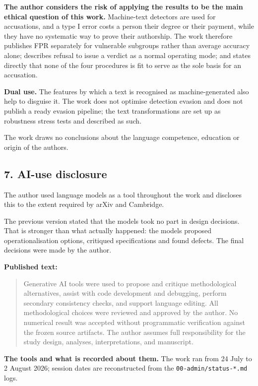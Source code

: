 \documentclass[11pt,a4paper]{article}
\renewcommand{\_}{\textunderscore\allowbreak}
\begin{document}
\textbf{The author considers the risk of applying the results to be the main ethical
question of this work.} Machine-text detectors are used for accusations, and a
type I error costs a person their degree or their payment, while they have no
systematic way to prove their authorship. The work therefore publishes FPR
separately for vulnerable subgroups rather than average accuracy alone; describes
refusal to issue a verdict as a normal operating mode; and states directly that none
of the four procedures is fit to serve as the sole basis for an accusation.

\textbf{Dual use.} The features by which a text is recognised as machine-generated also
help to disguise it. The work does not optimise detection evasion and does not
publish a ready evasion pipeline; the text transformations are set up as robustness
stress tests and described as such.

The work draws no conclusions about the language competence, education or origin of
the authors.

\subsection{7. AI-use disclosure}

The author used language models as a tool throughout the work and discloses this to
the extent required by arXiv and Cambridge.

The previous version stated that the models took no part in design decisions. That
is stronger than what actually happened: the models proposed operationalisation
options, critiqued specifications and found defects. The final decisions were made
by the author.

\textbf{Published text:}

\begin{quote}
Generative AI tools were used to propose and critique methodological alternatives,
assist with code development and debugging, perform secondary consistency checks,
and support language editing. All methodological choices were reviewed and
approved by the author. No numerical result was accepted without programmatic
verification against the frozen source artifacts. The author assumes full
responsibility for the study design, analyses, interpretations, and manuscript.
\end{quote}

\textbf{The tools and what is recorded about them.} The work ran from 24 July to
2 August 2026; session dates are reconstructed from the \texttt{00-\allowbreak{}admin/status-\allowbreak{}*.md} logs.
\end{document}
